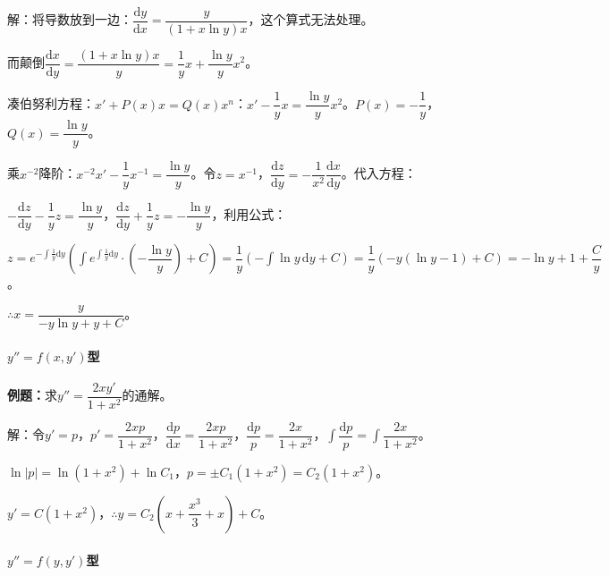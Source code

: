 解：将导数放到一边：$\dfrac{\textrm{d}y}{\textrm{d}x}=\dfrac{y}{(1+x\ln y)x}$，这个算式无法处理。

而颠倒$\dfrac{\textrm{d}x}{\textrm{d}y}=\dfrac{(1+x\ln y)x}{y}=\dfrac{1}{y}x+\dfrac{\ln y}{y}x^2$。

凑伯努利方程：$x'+P(x)x=Q(x)x^n$：$x'-\dfrac{1}{y}x=\dfrac{\ln y}{y}x^2$。$P(x)=-\dfrac{1}{y}$，$Q(x)=\dfrac{\ln y}{y}$。

乘$x^{-2}$降阶：$x^{-2}x'-\dfrac{1}{y}x^{-1}=\dfrac{\ln y}{y}$。令$z=x^{-1}$，$\dfrac{\textrm{d}z}{\textrm{d}y}=-\dfrac{1}{x^2}\dfrac{\textrm{d}x}{\textrm{d}y}$。代入方程：

$-\dfrac{\textrm{d}z}{\textrm{d}y}-\dfrac{1}{y}z=\dfrac{\ln y}{y}$，$\dfrac{\textrm{d}z}{\textrm{d}y}+\dfrac{1}{y}z=-\dfrac{\ln y}{y}$，利用公式：

$z=e^{-\int\frac{1}{y}\textrm{d}y}\left(\displaystyle{\int e^{\int\frac{1}{y}\textrm{d}y}\cdot\left(-\dfrac{\ln y}{y}\right)+C}\right)=\dfrac{1}{y}(-\int\ln y\,\textrm{d}y+C)=\dfrac{1}{y}(-y(\ln y-1)+C)=-\ln y+1+\dfrac{C}{y}$。

$\therefore x=\dfrac{y}{-y\ln y+y+C}$。

\paragraph{}

\paragraph{\texorpdfstring{$y''=f(x,y')$}\ 型}

\textbf{例题：}求$y''=\dfrac{2xy'}{1+x^2}$的通解。

解：令$y'=p$，$p'=\dfrac{2xp}{1+x^2}$，$\dfrac{\textrm{d}p}{\textrm{d}x}=\dfrac{2xp}{1+x^2}$，$\dfrac{\textrm{d}p}{p}=\dfrac{2x}{1+x^2}$，$\displaystyle{\int\dfrac{\textrm{d}p}{p}=\int\dfrac{2x}{1+x^2}}$。

$\ln\vert p\vert=\ln(1+x^2)+\ln C_1$，$p=\pm C_1(1+x^2)=C_2(1+x^2)$。

$y'=C(1+x^2)$，$\therefore y=C_2\left(x+\dfrac{x^3}{3}+x\right)+C$。

\paragraph{\texorpdfstring{$y''=f(y,y')$}\ 型}

\paragraph{}

